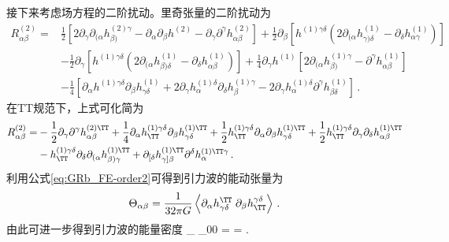 接下来考虑场方程的二阶扰动。里奇张量的二阶扰动为
    \begin{align}
        \label{eq:GRb_Ricci2o}
        R^{(2)}_{\alpha \beta}=&\frac{1}{2}\left[2\partial_\gamma \partial_{(\alpha}{h_{\beta)}^{(2)\gamma}} - \partial_\alpha \partial_\beta h^{(2)} - \partial_\gamma \partial^\gamma h^{(2)}_{\alpha \beta}\right] + \frac{1}{2} \partial_\beta \left[h^{(1)\gamma \delta}\left(2\partial_{(\alpha}h^{(1)}_{\gamma)\delta}-\partial_\delta h^{(1)}_{\alpha \gamma}\right)\right] \nonumber\\
        &-\frac{1}{2}\partial_\gamma \left[h^{(1)\gamma \delta}\left(2\partial_{(\alpha}h^{(1)}_{\beta)\delta}-\partial_\delta h^{(1)}_{\alpha \beta}\right)\right]+ \frac{1}{4}\partial_\gamma h^{(1)} \left[2\partial_{(\alpha}h^{(1)\gamma}_{\beta)} - \partial^\gamma h^{(1)}_{\alpha \beta}\right] \nonumber\\
        &-\frac{1}{4}\left[\partial_\alpha h^{(1)\gamma \delta}\partial_\beta h^{(1)}_{\gamma \delta}+2 \partial_\gamma h^{(1)\delta}_{\alpha} \partial_\delta h^{(1)\gamma}_{\beta} - 2\partial_\gamma h^{(1)\delta}_{\alpha} \partial^\gamma h^{(1)}_{\beta \delta}\right] \,.
    \end{align}
在TT规范下，上式可化简为
\begin{align}
    \label{eq:GRb_Ricci2}
    R^{(2)}_{\alpha \beta} =& -\frac{1}{2} \partial_\gamma \partial^\gamma h^{(2)\TT}_{\alpha \beta}
    + \frac{1}{4} \partial_\alpha h^{\tiny (1) \gamma \delta}_{\TT} \partial_\beta h^{\tiny (1)\TT}_{\gamma \delta} + \frac{1}{2}h^{\tiny (1)\gamma \delta}_\TT \partial_\alpha \partial_\beta h^{\tiny (1)\TT}_{\gamma \delta} + \frac{1}{2}h^{\tiny (1)\gamma \delta}_\TT \partial_\gamma \partial_\delta h^{\tiny (1)\TT}_{\alpha \beta} \nonumber \\
    &- h^{\tiny (1)\gamma \delta}_\TT \partial_\delta \partial_{(\alpha}h^{\tiny (1)\TT}_{\beta) \gamma}+ \partial_{[\delta}h_{\gamma]\beta}^{\tiny (1)\TT} \partial^\delta h_{\alpha}^{\tiny (1)\TT \gamma}\,.
\end{align}
利用公式\eqref{eq:GRb_FE-order2}可得到引力波的能动张量为
\begin{equation}
    \Theta_{\alpha \beta} = \frac{1}{32 \pi G} \avg{\partial_\alpha h^{\TT}_{\gamma \delta} \; \partial_\beta h^{\gamma \delta}_{\TT}}\,.
\end{equation}
由此可进一步得到引力波的能量密度
\e\label{rhogw}
\rho_{\GW} \equiv \Theta_{00} =    =  .
\q

